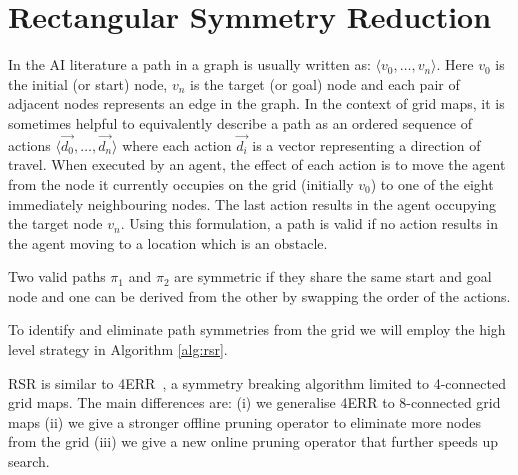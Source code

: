 \section{Rectangular Symmetry Reduction}
\label{sec:rsr}
In the AI literature a path in a graph is usually written as: $\langle v_0,\ldots,v_n\rangle$. 
Here $v_0$ is the initial (or start) node, $v_n$ is the target (or goal) node and 
each pair of adjacent nodes represents an edge in the graph.
In the context of grid maps, it is sometimes helpful to equivalently describe a path as an ordered sequence
of actions $\langle \vec{d_0}, \ldots, \vec{d_n}\rangle$ where each action $\vec{d_i}$ is a vector representing 
a direction of travel. 
When executed by an agent, the effect of each action is to move the agent from the node it currently
occupies on the grid (initially $v_0$) to one of the eight immediately neighbouring nodes. The last action 
results in the agent occupying the target node $v_n$.
Using this formulation, a path is valid if no action results
in the agent moving to a location which is an obstacle.

\begin{definition}
\label{def:symmetry}
Two valid paths $\pi_{1}$ and $\pi_{2}$ are symmetric if they share the same start and
goal node and one can be derived from the other by swapping the order of the actions.
\end{definition}

To identify and eliminate path symmetries from the grid we will employ the high 
level strategy in Algorithm \ref{alg:rsr}.



RSR is similar to 4ERR~\cite{harabor10}, a symmetry breaking algorithm 
limited to 4-connected grid maps.
The main differences are: (i) we generalise 4ERR to 8-connected grid maps 
(ii) we give a stronger offline pruning operator to eliminate more nodes from
the grid (iii) we give a new online pruning operator that further speeds up search.
